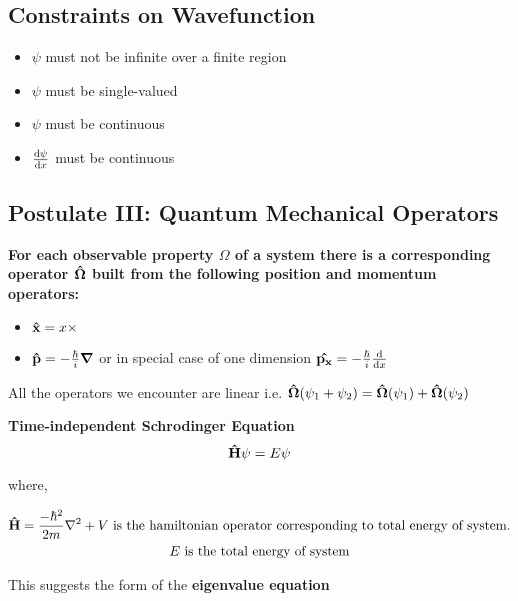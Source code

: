 \documentclass[11pt]{article}
\theoremstyle{definition}
\begin{document}
\subsection{Constraints on Wavefunction}

\begin{itemize}
    \item $\psi$ must not be infinite over a finite region
    \item $\psi$ must be single-valued
    \item $\psi$ must be continuous
    \item $\dv{\psi}{x}$ must be continuous
\end{itemize}

\subsection{Postulate III: Quantum Mechanical Operators}

\textbf{For each observable property $\Omega$ of a system there is a corresponding operator $\vectorunit{\Omega}$ built from the following position and momentum operators:}

\begin{itemize}
    \item $\vectorunit{x} = x \times$
    \item $\vectorunit{p} = -\frac{\hbar}{i} \grad$ or in special case of one dimension $\vectorunit{p_x} = -\frac{\hbar}{i} \dv{}{x}$
\end{itemize}

All the operators we encounter are linear i.e. $\vectorunit{\Omega}(\psi_1 + \psi_2) =  \vectorunit{\Omega}(\psi_1) + \vectorunit{\Omega}(\psi_2)$

\begin{shaded}
\textbf{Time-independent Schrodinger Equation}
\begin{equation*}
\vectorunit{H}\psi = E\psi
\end{equation*}

where,

\begin{gather*}
\vectorunit{H} = \frac{-\hbar^2}{2m} \laplacian + V \text{ is the hamiltonian operator corresponding to total energy of system.} \\
E \text{ is the total energy of system}
\end{gather*}
\end{shaded}



This suggests the form of the \textbf{eigenvalue equation} 
\end{document}
